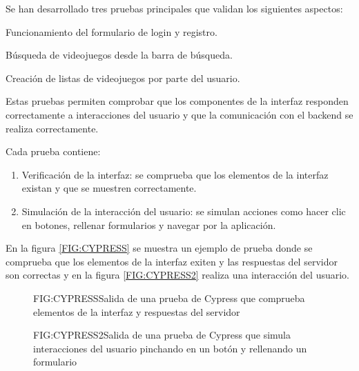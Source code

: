 Se han desarrollado tres pruebas principales que validan los siguientes aspectos: 
\begin{description}
    \item Funcionamiento del formulario de login y registro.
    \item Búsqueda de videojuegos desde la barra de búsqueda.
    \item Creación de listas de videojuegos por parte del usuario.
\end{description}

Estas pruebas permiten comprobar que los componentes de la interfaz responden correctamente a interacciones del usuario y que la comunicación con el backend se realiza correctamente.

Cada prueba contiene:
\begin{enumerate}
    \item Verificación de la interfaz: se comprueba que los elementos de la interfaz existan y que se muestren correctamente.
    \item Simulación de la interacción del usuario: se simulan acciones como hacer clic en botones, rellenar formularios y navegar por la aplicación.
\end{enumerate}

En la figura \ref{FIG:CYPRESS} se muestra un ejemplo de prueba donde se comprueba que los elementos de la interfaz exiten y las respuestas del servidor son correctas 
y en la figura \ref{FIG:CYPRESS2} realiza una interacción del usuario.

\begin{figure}[Pruebas Cypress comprobación de elementos]{FIG:CYPRESS}{Salida de una prueba de Cypress que comprueba elementos de la interfaz y respuestas del servidor}
\end{figure}
\begin{figure}[Pruebas Cypress interacción del usuario]{FIG:CYPRESS2}{Salida de una prueba de Cypress que simula interacciones del usuario pinchando en un botón y rellenando un formulario}
\end{figure}